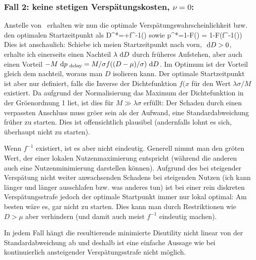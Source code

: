 \subsubsection{Fall 2: keine stetigen Versp\"atungskosten, $\nu=0$:}
Anstelle von~ erhalten wir nun die optimale
Versp\"atungswahrscheinlichkeit bzw. den optimalen
Startzeitpunkt als
\be
\label{zuverl-Dopt-diskr}
D^*=\mu+\sigma f^{-1}\left(\right)
\ee
sowie
\be
p^*=1-F\left(\right)
= 1-F\left(f^{-1}\left(\right)\right)
\ee
Dies ist anschaulich: Schiebe ich meien Startzeitpunkt nach vorn,
$\ \textrm{d} D>0$, erhalte ich einerseits einen Nachteil $\lambda\ \textrm{d} D$
durch fr\"uheres Aufstehen, aber auch einen Vorteil 
$-M\ \textrm{d} p_{{\mbox{ {\scriptsize \hspace{-0.2ex}delay}}}}=M/\sigma f((D-\mu)/\sigma)\ \textrm{d} D$. Im Optimum
ist der Vorteil gleich dem nachteil, woraus man
$D$ isolieren kann.
Der optimale Startzeitpunkt ist aber  nur definiert, falls die Inverse der
Dichtefunktion $f(x$ f\"ur den Wert $\lambda \sigma/M$ 
existiert. Da aufgrund der Normalisierung das Maximum der
Dichtefunktion in der Gr\"o\3enordnung 1 liet, ist dies f\"ur $M\gg
\lambda \sigma$ erf\"ullt: Der Schaden durch einen verpassten
Anschluss muss gr\"o\3er sein als der Aufwand, eine Standardabweichung
fr\"uher zu starten. Dies ist offensichtlich plausibel (andernfalls
lohnt es sich, \"uberhaupt nicht zu starten).

Wenn $f^{-1}$ existiert, ist es aber nicht eindeutig. Generell nimmt
man den gr\"o\3ten Wert, der einer lokalen Nutzenmaximierung
entspricht (w\"ahrend die anderen auch eine Nutzenminimierung
darstellen k\"onnen). Aufgrund des bei steigender Versp\"atung nicht
weiter anwachsenden Schadens bei steigenden Nutzen (ich kann l\"anger
und l\"anger ausschlafen bzw. was anderes tun) ist bei einer rein
diskreten Versp\"atungsstrafe jedoch der optimale Startpunkt immer nur
lokal optimal: Am besten w\"are es, gar nicht zu starten. Dies kann
man durch Restriktionen wie $D>\mu$ aber verhindern (und damit auch
meist $f^{-1}$ eindeutig machen).

In jedem Fall h\"angt die resultierende minimierte Disutility nicht
linear von der Standardabweichung ab und deshalb ist eine einfache
Aussage wie bei kontinuierlich ansteigender Versp\"atungsstrafe nicht
m\"oglich.


